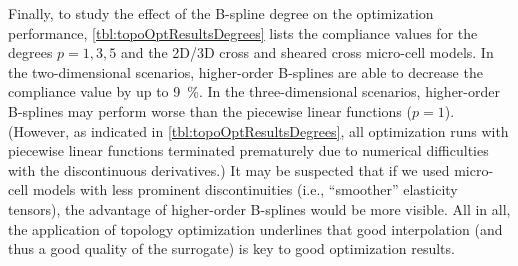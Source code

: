 Finally, to study the effect of the B-spline degree on the
optimization performance,
\cref{tbl:topoOptResultsDegrees} lists the compliance values
for the degrees $p = 1, 3, 5$ and the 2D/3D cross and sheared cross
micro-cell models.
In the two-dimensional scenarios,
higher-order B-splines are able to decrease the compliance value
by up to \SI{9}{\percent}.
In the three-dimensional scenarios,
higher-order B-splines may perform worse than the piecewise linear
functions ($p = 1$).
(However, as indicated in \cref{tbl:topoOptResultsDegrees},
all optimization runs with piecewise linear functions
terminated prematurely due to numerical difficulties with the
discontinuous derivatives.)
It may be suspected that if we used micro-cell models with
less prominent discontinuities (i.e., ``smoother'' elasticity tensors),
the advantage of higher-order B-splines would be more visible.
All in all, the application of topology optimization underlines
that good interpolation (and thus a good quality of the surrogate)
is key to good optimization results.

